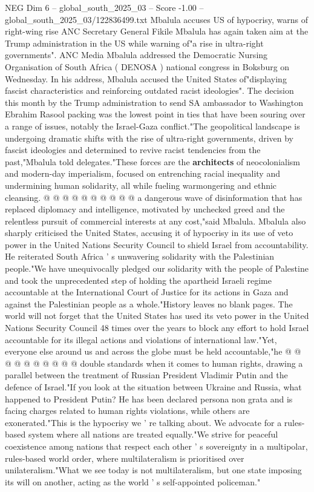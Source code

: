 \begin{textsample}{NEG Dim 6 – global\_south\_2025\_03 – Score -1.00 – global\_south\_2025\_03/122836499.txt}  \label{ex:f6_neg_216}
Mbalula accuses US of hypocrisy, warns of right-wing rise ANC Secretary General Fikile Mbalula has again taken aim at the Trump administration in the US while warning of"a rise in ultra-right governments".
ANC Media Mbalula addressed the Democratic Nursing Organisation of South Africa ( DENOSA ) national congress in Boksburg on Wednesday.
In his address, Mbalula accused the United States of"displaying fascist characteristics and reinforcing outdated racist ideologies".
The decision this month by the Trump administration to send SA ambassador to Washington Ebrahim Rasool packing was the lowest point in ties that have been souring over a range of issues, notably the Israel-Gaza conflict."The geopolitical landscape is undergoing dramatic shifts with the rise of ultra-right governments, driven by fascist ideologies and determined to revive racist tendencies from the past,"Mbalula told delegates."These forces are the \textbf{architects} of neocolonialism and modern-day imperialism, focused on entrenching racial inequality and undermining human solidarity, all while fueling warmongering and ethnic cleansing. @ @ @ @ @ @ @ @ @ @ a dangerous wave of disinformation that has replaced diplomacy and intelligence, motivated by unchecked greed and the relentless pursuit of commercial interests at any cost,"said Mbalula.
Mbalula also sharply criticised the United States, accusing it of hypocrisy in its use of veto power in the United Nations Security Council to shield Israel from accountability.
He reiterated South Africa ' s unwavering solidarity with the Palestinian people."We have unequivocally pledged our solidarity with the people of Palestine and took the unprecedented step of holding the apartheid Israeli regime accountable at the International Court of Justice for its actions in Gaza and against the Palestinian people as a whole."History leaves no blank pages.
The world will not forget that the United States has used its veto power in the United Nations Security Council 48 times over the years to block any effort to hold Israel accountable for its illegal actions and violations of international law."Yet, everyone else around us and across the globe must be held accountable,"he @ @ @ @ @ @ @ @ @ @ double standards when it comes to human rights, drawing a parallel between the treatment of Russian President Vladimir Putin and the defence of Israel."If you look at the situation between Ukraine and Russia, what happened to President Putin?
He has been declared persona non grata and is facing charges related to human rights violations, while others are exonerated."This is the hypocrisy we ' re talking about.
We advocate for a rules-based system where all nations are treated equally."We strive for peaceful coexistence among nations that respect each other ' s sovereignty in a multipolar, rules-based world order, where multilateralism is prioritised over unilateralism."What we see today is not multilateralism, but one state imposing its will on another, acting as the world ' s self-appointed policeman."

\end{textsample}
